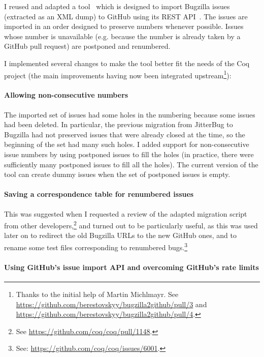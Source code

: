I reused and adapted a tool~\cite{bugzilla2github} which is designed to import Bugzilla issues (extracted as an XML dump) to GitHub using its REST API~\cite{github_REST_API}. The issues are imported in an order designed to preserve numbers whenever possible. Issues whose number is unavailable (e.g. because the number is already taken by a GitHub pull request) are postponed and renumbered.

I implemented several changes to make the tool better fit the needs of the Coq project (the main improvements having now been integrated upstream\footnote{
	Thanks to the initial help of Martin Michlmayr.
	See \url{https://github.com/berestovskyy/bugzilla2github/pull/3} and \url{https://github.com/berestovskyy/bugzilla2github/pull/4}.
}):

\paragraph{Allowing non-consecutive numbers}

The imported set of issues had some holes in the numbering because some issues had been deleted.
In particular, the previous migration from JitterBug to Bugzilla had not preserved issues that were already closed at the time, so the beginning of the set had many such holes.
I added support for non-consecutive issue numbers by using postponed issues to fill the holes (in practice, there were sufficiently many postponed issues to fill all the holes).
The current version of the tool can create dummy issues when the set of postponed issues is empty.

\paragraph{Saving a correspondence table for renumbered issues}

This was suggested when I requested a review of the adapted migration script from other developers,\footnote{
	See \url{https://github.com/coq/coq/pull/1148}.
}
and turned out to be particularly useful, as this was used later on to redirect the old Bugzilla URLs to the new GitHub ones, and to rename some test files corresponding to renumbered bugs.\footnote{
	See: \url{https://github.com/coq/coq/issues/6001}.
}

\paragraph{Using GitHub's issue import API and overcoming GitHub's rate limits}

